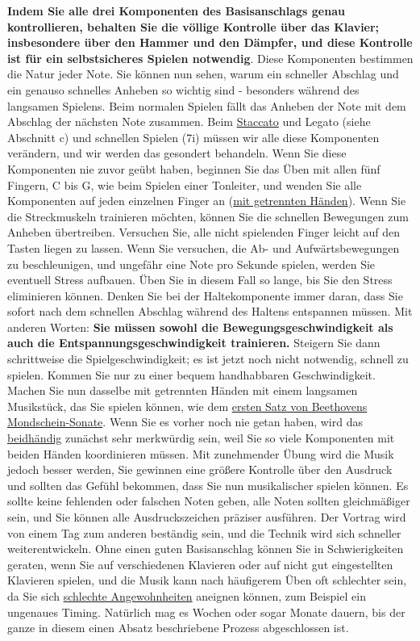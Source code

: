 \textbf{Indem Sie alle drei Komponenten des Basisanschlags genau kontrollieren, behalten Sie die völlige Kontrolle über das Klavier; insbesondere über den Hammer und den Dämpfer, und diese Kontrolle ist für ein selbstsicheres Spielen notwendig}.
Diese Komponenten bestimmen die Natur jeder Note.
Sie können nun sehen, warum ein schneller Abschlag und ein genauso schnelles Anheben so wichtig sind - besonders während des langsamen Spielens.
Beim normalen Spielen fällt das Anheben der Note mit dem Abschlag der nächsten Note zusammen.
Beim \hyperref[c1iii1c]{Staccato} und Legato (siehe Abschnitt c) und schnellen Spielen (7i) müssen wir alle diese Komponenten verändern, und wir werden das gesondert behandeln.
Wenn Sie diese Komponenten nie zuvor geübt haben, beginnen Sie das Üben mit allen fünf Fingern, C bis G, wie beim Spielen einer Tonleiter, und wenden Sie alle Komponenten auf jeden einzelnen Finger an (\hyperref[c1ii7]{mit getrennten Händen}).
Wenn Sie die Streckmuskeln trainieren möchten, können Sie die schnellen Bewegungen zum Anheben übertreiben.
Versuchen Sie, alle nicht spielenden Finger leicht auf den Tasten liegen zu lassen.
Wenn Sie versuchen, die Ab- und Aufwärtsbewegungen zu beschleunigen, und ungefähr eine Note pro Sekunde spielen, werden Sie eventuell Stress aufbauen.
Üben Sie in diesem Fall so lange, bis Sie den Stress eliminieren können.
Denken Sie bei der Haltekomponente immer daran, dass Sie sofort nach dem schnellen Abschlag während des Haltens entspannen müssen.
Mit anderen Worten: \textbf{Sie müssen sowohl die Bewegungsgeschwindigkeit als auch die Entspannungsgeschwindigkeit trainieren.}
Steigern Sie dann schrittweise die Spielgeschwindigkeit; es ist jetzt noch nicht notwendig, schnell zu spielen.
Kommen Sie nur zu einer bequem handhabbaren Geschwindigkeit.
Machen Sie nun dasselbe mit getrennten Händen mit einem langsamen Musikstück, das Sie spielen können, wie dem \hyperref[c1ii25b]{ersten Satz von Beethovens Mondschein-Sonate}.
Wenn Sie es vorher noch nie getan haben, wird das \hyperref[c1ii25]{beidhändig} zunächst sehr merkwürdig sein, weil Sie so viele Komponenten mit beiden Händen koordinieren müssen.
Mit zunehmender Übung wird die Musik jedoch besser werden, Sie gewinnen eine größere Kontrolle über den Ausdruck und sollten das Gefühl bekommen, dass Sie nun musikalischer spielen können.
Es sollte keine fehlenden oder falschen Noten geben, alle Noten sollten gleichmäßiger sein, und Sie können alle Ausdruckszeichen präziser ausführen.
Der Vortrag wird von einem Tag zum anderen beständig sein, und die Technik wird sich schneller weiterentwickeln.
Ohne einen guten Basisanschlag können Sie in Schwierigkeiten geraten, wenn Sie auf verschiedenen Klavieren oder auf nicht gut eingestellten Klavieren spielen, und die Musik kann nach häufigerem Üben oft schlechter sein, da Sie sich \hyperref[c1ii22]{schlechte Angewohnheiten} aneignen können, zum Beispiel ein ungenaues Timing.
Natürlich mag es Wochen oder sogar Monate dauern, bis der ganze in diesem einen Absatz beschriebene Prozess abgeschlossen ist.


